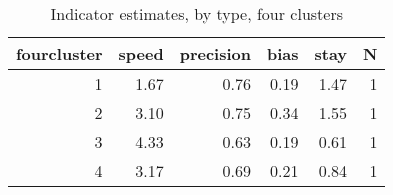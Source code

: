 \begin{table}

\caption{\label{tab:}Indicator estimates, by type, four clusters}
\centering
\begin{tabular}[t]{rrrrrr}
\toprule
fourcluster & speed & precision & bias & stay & N\\
\midrule
1 & 1.67 & 0.76 & 0.19 & 1.47 & 1\\
2 & 3.10 & 0.75 & 0.34 & 1.55 & 1\\
3 & 4.33 & 0.63 & 0.19 & 0.61 & 1\\
4 & 3.17 & 0.69 & 0.21 & 0.84 & 1\\
\bottomrule
\end{tabular}
\end{table}
